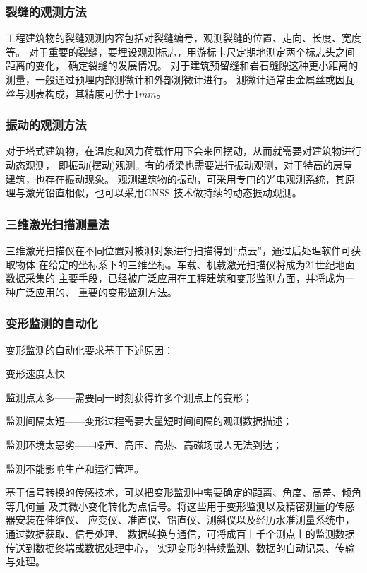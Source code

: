 \subsubsection*{裂缝的观测方法}
工程建筑物的裂缝观测内容包括对裂缝编号，观测裂缝的位置、走向、长度、宽度等。
对于重要的裂缝，要埋设观测标志，用游标卡尺定期地测定两个标志头之间距离的变化，
确定裂缝的发展情况。
对于建筑预留缝和岩石缝隙这种更小距离的测量，一般通过预埋内部测微计和外部测微计进行。
测微计通常由金属丝或因瓦丝与测表构成，其精度可优于$1mm$。
\subsubsection*{振动的观测方法}
对于塔式建筑物，在温度和风力荷载作用下会来回摆动，从而就需要对建筑物进行动态观测，
即振动(摆动)观测。有的桥梁也需要进行振动观测，对于特高的房屋建筑，也存在振动现象。
观测建筑物的振动，可采用专门的光电观测系统，其原理与激光铅直相似，也可以采用GNSS
技术做持续的动态振动观测。
\subsubsection*{三维激光扫描测量法}
三维激光扫描仪在不同位置对被测对象进行扫描得到“点云”，通过后处理软件可获取物体
在给定的坐标系下的三维坐标。车载、机载激光扫描仪将成为21世纪地面数据采集的
主要手段，已经被广泛应用在工程建筑和变形监测方面，并将成为一种广泛应用的、
重要的变形监测方法。
\subsubsection*{变形监测的自动化}
变形监测的自动化要求基于下述原因：
\begin{asparaitem}[$\bullet$]
\item 变形速度太快
\item 监测点太多——需要同一时刻获得许多个测点上的变形；
\item 监测间隔太短——变形过程需要大量短时间间隔的观测数据描述；
\item 监测环境太恶劣——噪声、高压、高热、高磁场或人无法到达；
\item 监测不能影响生产和运行管理。
\end{asparaitem}
基于信号转换的传感技术，可以把变形监测中需要确定的距离、角度、高差、倾角等几何量
及其微小变化转化为点信号。将这些用于变形监测以及精密测量的传感器安装在伸缩仪、
应变仪、准直仪、铅直仪、测斜仪以及经历水准测量系统中，通过数据获取、信号处理、
数据转换与通信，可将成百上千个测点上的监测数据传送到数据终端或数据处理中心，
实现变形的持续监测、数据的自动记录、传输与处理。

